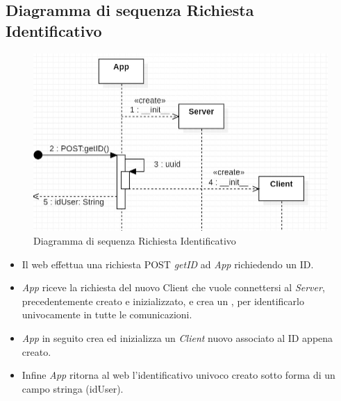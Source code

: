 \subsection{Diagramma di sequenza Richiesta Identificativo}
\begin{figure}[H]
    \centering\includegraphics[width=\linewidth]{images/diagramma_sequenza_client.jpg}
    \caption{Diagramma di sequenza Richiesta Identificativo}
\end{figure}
\begin{itemize}
    \item Il  web effettua una richiesta POST \textit{getID} ad \textit{App} richiedendo un ID.
    \item \textit{App} riceve la richiesta del nuovo Client che vuole connettersi al \textit{Server}, precedentemente creato e inizializzato, e crea un , per identificarlo univocamente in tutte le comunicazioni.
    \item \textit{App} in seguito crea ed inizializza un \textit{Client} nuovo associato al ID appena creato.
    \item Infine \textit{App} ritorna al  web l'identificativo univoco creato sotto forma di un campo stringa (idUser).
\end{itemize}
\newpage